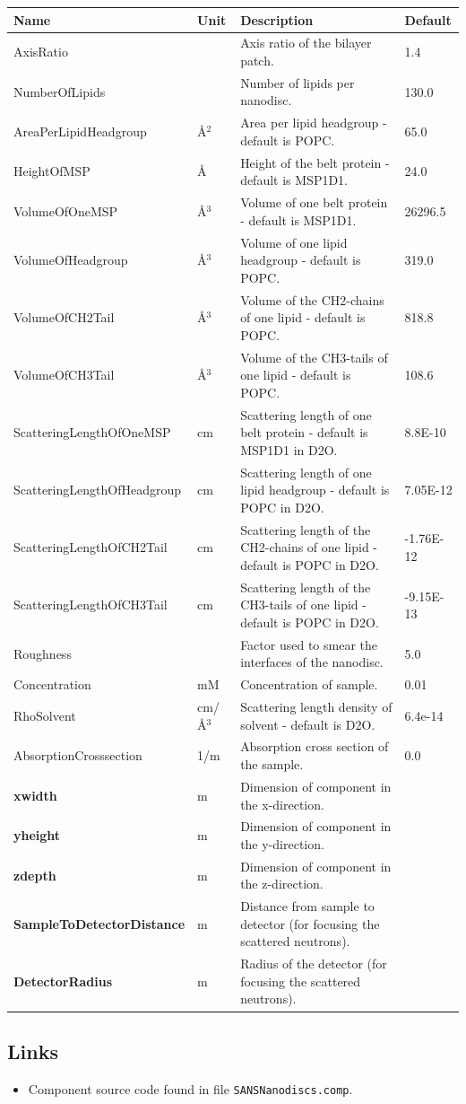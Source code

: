 \begin{longtable}{p{}p{}p{}p{}}
\toprule
\textbf{Name} & \textbf{Unit} & \textbf{Description} & \textbf{Default} \\
\midrule
\endhead
AxisRatio &  & Axis ratio of the bilayer patch. & 1.4 \\
NumberOfLipids &  & Number of lipids per nanodisc. & 130.0 \\
AreaPerLipidHeadgroup & \AA{}$^{2}$ & Area per lipid headgroup - default is POPC. & 65.0 \\
HeightOfMSP & \AA{} & Height of the belt protein - default is MSP1D1. & 24.0 \\
VolumeOfOneMSP & \AA{}$^{3}$ & Volume of one belt protein - default is MSP1D1. & 26296.5 \\
VolumeOfHeadgroup & \AA{}$^{3}$ & Volume of one lipid headgroup - default is POPC. & 319.0 \\
VolumeOfCH2Tail & \AA{}$^{3}$ & Volume of the CH2-chains of one lipid - default is POPC. & 818.8 \\
VolumeOfCH3Tail & \AA{}$^{3}$ & Volume of the CH3-tails of one lipid - default is POPC. & 108.6 \\
ScatteringLengthOfOneMSP & cm & Scattering length of one belt protein - default is MSP1D1 in D2O. & 8.8E-10 \\
ScatteringLengthOfHeadgroup & cm & Scattering length of one lipid headgroup - default is POPC in D2O. & 7.05E-12 \\
ScatteringLengthOfCH2Tail & cm & Scattering length of the CH2-chains of one lipid - default is POPC in D2O. & -1.76E-12 \\
ScatteringLengthOfCH3Tail & cm & Scattering length of the CH3-tails of one lipid - default is POPC in D2O. & -9.15E-13 \\
Roughness &  & Factor used to smear the interfaces of the nanodisc. & 5.0 \\
Concentration & mM & Concentration of sample. & 0.01 \\
RhoSolvent & cm/\AA{}$^{3}$ & Scattering length density of solvent - default is D2O. & 6.4e-14 \\
AbsorptionCrosssection & 1/m & Absorption cross section of the sample. & 0.0 \\
\textbf{xwidth} & m & Dimension of component in the x-direction. &  \\
\textbf{yheight} & m & Dimension of component in the y-direction. &  \\
\textbf{zdepth} & m & Dimension of component in the z-direction. &  \\
\textbf{SampleToDetectorDistance} & m & Distance from sample to detector (for focusing the scattered neutrons). &  \\
\textbf{DetectorRadius} & m & Radius of the detector (for focusing the scattered neutrons). &  \\
\bottomrule
\end{longtable}

\subsection*{Links}
\begin{itemize}
  \item Component source code found in file \texttt{SANSNanodiscs.comp}.
\end{itemize}

